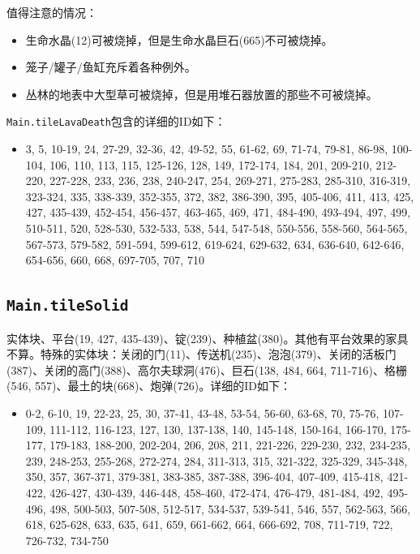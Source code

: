 值得注意的情况：
\begin{itemize}
  \item 生命水晶(12)可被烧掉，但是生命水晶巨石(665)不可被烧掉。
  \item 笼子/罐子/鱼缸充斥着各种例外。
  \item 丛林的地表中大型草可被烧掉，但是用堆石器放置的那些不可被烧掉。
\end{itemize}

\texttt{Main.tileLavaDeath}包含的详细的ID如下：
\begin{itemize}
  \item 3, 5, 10-19, 24, 27-29, 32-36, 42, 49-52, 55, 61-62, 69, 71-74, 79-81, 86-98, 100-104, 106, 110, 113, 115, 125-126, 128, 149, 172-174, 184, 201, 209-210, 212-220, 227-228, 233, 236, 238, 240-247, 254, 269-271, 275-283, 285-310, 316-319, 323-324, 335, 338-339, 352-355, 372, 382, 386-390, 395, 405-406, 411, 413, 425, 427, 435-439, 452-454, 456-457, 463-465, 469, 471, 484-490, 493-494, 497, 499, 510-511, 520, 528-530, 532-533, 538, 544, 547-548, 550-556, 558-560, 564-565, 567-573, 579-582, 591-594, 599-612, 619-624, 629-632, 634, 636-640, 642-646, 654-656, 660, 668, 697-705, 707, 710
\end{itemize}

\subsection{\texttt{Main.tileSolid}}\label{src:tileSolid}
实体块、平台(19, 427, 435-439)、锭(239)、种植盆(380)。其他有平台效果的家具不算。特殊的实体块：关闭的门(11)、传送机(235)、泡泡(379)、关闭的活板门(387)、关闭的高门(388)、高尔夫球洞(476)、巨石(138, 484, 664, 711-716)、格栅(546, 557)、最土的块(668)、炮弹(726)。详细的ID如下：
\begin{itemize}
  \item 0-2, 6-10, 19, 22-23, 25, 30, 37-41, 43-48, 53-54, 56-60, 63-68, 70, 75-76, 107-109, 111-112, 116-123, 127, 130, 137-138, 140, 145-148, 150-164, 166-170, 175-177, 179-183, 188-200, 202-204, 206, 208, 211, 221-226, 229-230, 232, 234-235, 239, 248-253, 255-268, 272-274, 284, 311-313, 315, 321-322, 325-329, 345-348, 350, 357, 367-371, 379-381, 383-385, 387-388, 396-404, 407-409, 415-418, 421-422, 426-427, 430-439, 446-448, 458-460, 472-474, 476-479, 481-484, 492, 495-496, 498, 500-503, 507-508, 512-517, 534-537, 539-541, 546, 557, 562-563, 566, 618, 625-628, 633, 635, 641, 659, 661-662, 664, 666-692, 708, 711-719, 722, 726-732, 734-750
\end{itemize}

